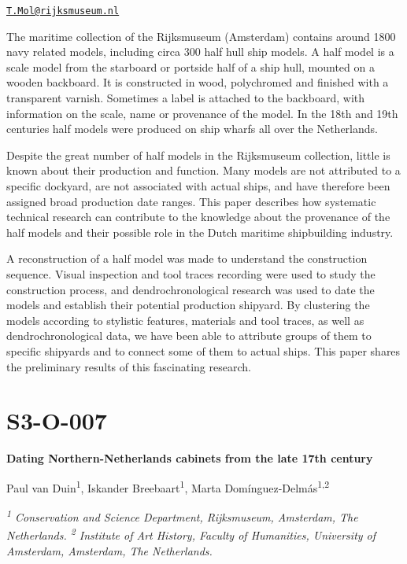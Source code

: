 \documentclass[
]{book}
\begin{document}
\href{mailto:T.Mol@rijksmuseum.nl}{\nolinkurl{T.Mol@rijksmuseum.nl}}

The maritime collection of the Rijksmuseum (Amsterdam) contains around 1800 navy related models, including circa 300 half hull ship models. A half model is a scale model from the starboard or portside half of a ship hull, mounted on a wooden backboard. It is constructed in wood, polychromed and finished with a transparent varnish. Sometimes a label is attached to the backboard, with information on the scale, name or provenance of the model. In the 18th and 19th centuries half models were produced on ship wharfs all over the Netherlands.

Despite the great number of half models in the Rijksmuseum collection, little is known about their production and function. Many models are not attributed to a specific dockyard, are not associated with actual ships, and have therefore been assigned broad production date ranges. This paper describes how systematic technical research can contribute to the knowledge about the provenance of the half models and their possible role in the Dutch maritime shipbuilding industry.

A reconstruction of a half model was made to understand the construction sequence. Visual inspection and tool traces recording were used to study the construction process, and dendrochronological research was used to date the models and establish their potential production shipyard. By clustering the models according to stylistic features, materials and tool traces, as well as dendrochronological data, we have been able to attribute groups of them to specific shipyards and to connect some of them to actual ships. This paper shares the preliminary results of this fascinating research.

\hypertarget{s3-o-007}{%
\section*{S3-O-007}\label{s3-o-007}}

\textbf{Dating Northern-Netherlands cabinets from the late 17th century}

Paul van Duin\textsuperscript{1}, Iskander Breebaart\textsuperscript{1}, Marta Domínguez-Delmás\textsuperscript{1,2}

\emph{\textsuperscript{1} Conservation and Science Department, Rijksmuseum, Amsterdam, The Netherlands. \textsuperscript{2} Institute of Art History, Faculty of Humanities, University of Amsterdam, Amsterdam, The Netherlands.}
\end{document}
